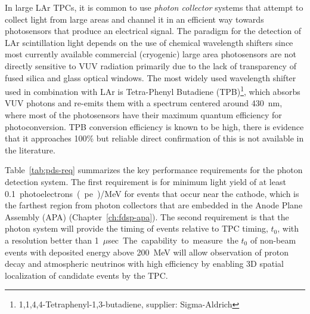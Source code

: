 In large LAr TPCs, it is common to use {\it photon collector} systems that attempt to 
collect light from large areas and channel it in an efficient way towards  
photosensors that produce an electrical signal.
The paradigm for the detection of LAr scintillation light depends on the use of 
chemical wavelength shifters since most currently available commercial (cryogenic) large area photosensors are not 
directly sensitive to VUV radiation primarily due to the lack of transparency of fused silica and 
glass optical windows. The most widely used wavelength shifter used in 
combination with LAr is Tetra-Phenyl Butadiene (TPB)\footnote{1,1,4,4-Tetraphenyl-1,3-butadiene, supplier: Sigma-Aldrich\textregistered}, which absorbs VUV photons and re-emits them with a spectrum centered around \SI{430}{nm}, where most of the 
photosensors have their maximum quantum efficiency for photoconversion. 
TPB conversion efficiency is known to be high, there is evidence that 
it approaches 100\% but reliable direct confirmation of this is not available in the literature.


Table~\ref{tab:pds-req} summarizes the key performance requirements for the photon detection system.
The first requirement is for minimum light yield of at least \SI{0.1}{photoelectrons(pe)/MeV} for events that occur near the cathode, which is the farthest region from photon collectors that are embedded in the Anode Plane Assembly (APA) (Chapter~\ref{ch:fdsp-apa}). 
The second requirement is that the photon system will provide the timing of events relative to TPC timing, $t_0$, with a 
resolution better than \SI{1}{$\mu$sec}.  The capability to measure the $t_0$ of non-beam events with deposited 
energy above \SI{200}{MeV} will allow observation of proton decay and atmospheric neutrinos with high 
efficiency by enabling 3D spatial localization of candidate events by the TPC. 

